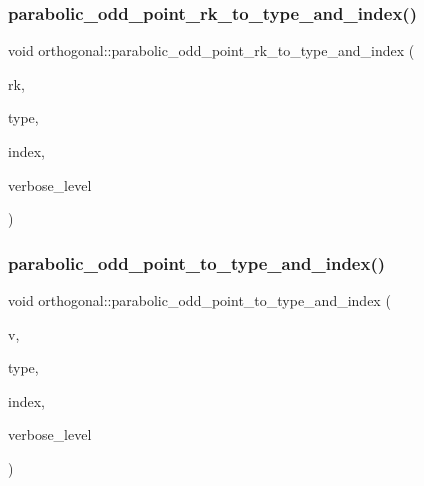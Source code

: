 \subsubsection{\texorpdfstring{parabolic\+\_\+odd\+\_\+point\+\_\+rk\+\_\+to\+\_\+type\+\_\+and\+\_\+index()}{parabolic\_odd\_point\_rk\_to\_type\_and\_index()}}
{\footnotesize\ttfamily void orthogonal\+::parabolic\+\_\+odd\+\_\+point\+\_\+rk\+\_\+to\+\_\+type\+\_\+and\+\_\+index (\begin{DoxyParamCaption}\item[{\mbox{\hyperlink{galois_8h_a09fddde158a3a20bd2dcadb609de11dc}{I\+NT}}}]{rk,  }\item[{\mbox{\hyperlink{galois_8h_a09fddde158a3a20bd2dcadb609de11dc}{I\+NT}} \&}]{type,  }\item[{\mbox{\hyperlink{galois_8h_a09fddde158a3a20bd2dcadb609de11dc}{I\+NT}} \&}]{index,  }\item[{\mbox{\hyperlink{galois_8h_a09fddde158a3a20bd2dcadb609de11dc}{I\+NT}}}]{verbose\+\_\+level }\end{DoxyParamCaption})}

\mbox{\label{classorthogonal_ab622195db63c362531a84080a95d38ff}} 
\subsubsection{\texorpdfstring{parabolic\+\_\+odd\+\_\+point\+\_\+to\+\_\+type\+\_\+and\+\_\+index()}{parabolic\_odd\_point\_to\_type\_and\_index()}}
{\footnotesize\ttfamily void orthogonal\+::parabolic\+\_\+odd\+\_\+point\+\_\+to\+\_\+type\+\_\+and\+\_\+index (\begin{DoxyParamCaption}\item[{\mbox{\hyperlink{galois_8h_a09fddde158a3a20bd2dcadb609de11dc}{I\+NT}} $\ast$}]{v,  }\item[{\mbox{\hyperlink{galois_8h_a09fddde158a3a20bd2dcadb609de11dc}{I\+NT}} \&}]{type,  }\item[{\mbox{\hyperlink{galois_8h_a09fddde158a3a20bd2dcadb609de11dc}{I\+NT}} \&}]{index,  }\item[{\mbox{\hyperlink{galois_8h_a09fddde158a3a20bd2dcadb609de11dc}{I\+NT}}}]{verbose\+\_\+level }\end{DoxyParamCaption})}

